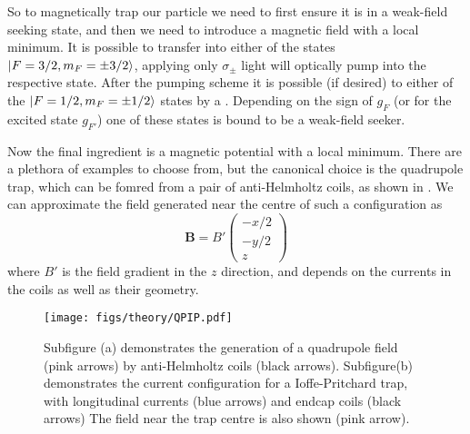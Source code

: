 So to magnetically trap our particle we need to first ensure it is in a
weak-field seeking state, and then we need to introduce a magnetic field with a
local minimum. It is possible to transfer into either of the states
$\ket{F=3/2, m_F=\pm3/2}$, applying only $\sigma_\pm$ light will optically pump
into the respective state. After the pumping scheme it is possible (if desired)
to either of the $\ket{F=1/2, m_F=\pm1/2}$ states by a . Depending on the sign of $g_F$ (or for the excited state $g_{F'}$) 
one of these states is bound to be a weak-field seeker.

Now the final ingredient is a magnetic potential with a local minimum. There
are a plethora of examples to choose from, but the canonical choice is the
quadrupole trap, which can be fomred from a pair of anti-Helmholtz coils, as
shown in . We can approximate the field
generated near the centre of such a configuration as~\cite{Metcalf1999}
%
\begin{equation}
  \mathbf{B} = B'\begin{pmatrix} -x/2 \\ -y/2 \\ z \end{pmatrix}
  \label{theory:eqn:quadrupole}
\end{equation}
%
where $B'$ is the field gradient in the $z$ direction, and depends on the
currents in the coils as well as their geometry.

\begin{figure}
  \centering
  \texttt{[image: figs/theory/QPIP.pdf]}
  \caption{Subfigure (a) demonstrates the generation of a quadrupole field
    (pink arrows) by
  anti-Helmholtz coils (black arrows). Subfigure(b) demonstrates the current
  configuration for a
  Ioffe-Pritchard trap, with longitudinal currents (blue arrows) and endcap
coils (black arrows) The field near the trap centre is also shown (pink arrow).
}
  \label{theory:fig:fields}
\end{figure}

